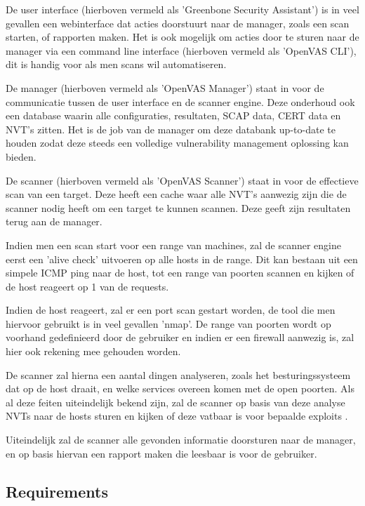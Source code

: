 De user interface (hierboven vermeld als 'Greenbone Security Assistant') is in veel gevallen een webinterface dat acties doorstuurt naar de manager, zoals een scan starten, of rapporten maken. Het is ook mogelijk om acties door te sturen naar de manager via een command line interface (hierboven vermeld als 'OpenVAS CLI'), dit is handig voor als men scans wil automatiseren.

De manager (hierboven vermeld als 'OpenVAS Manager') staat in voor de communicatie tussen de user interface en de scanner engine. Deze onderhoud ook een database waarin alle configuraties, resultaten, SCAP data, CERT data en NVT's zitten. Het is de job van de manager om deze databank up-to-date te houden zodat deze steeds een volledige vulnerability management oplossing kan bieden.

De scanner (hierboven vermeld als 'OpenVAS Scanner') staat in voor de effectieve scan van een target. Deze heeft een cache waar alle NVT's aanwezig zijn die de scanner nodig heeft om een target te kunnen scannen. Deze geeft zijn resultaten terug aan de manager. 

Indien men een scan start voor een range van machines, zal de scanner engine eerst een 'alive check' uitvoeren op alle hosts in de range. Dit kan bestaan uit een simpele ICMP ping naar de host, tot een range van poorten scannen en kijken of de host reageert op 1 van de requests. 

Indien de host reageert, zal er een port scan gestart worden, de tool die men hiervoor gebruikt is in veel gevallen 'nmap'. De range van poorten wordt op voorhand gedefinieerd door de gebruiker en indien er een firewall aanwezig is, zal hier ook rekening mee gehouden worden. 

De scanner zal hierna een aantal dingen analyseren, zoals het besturingssysteem dat op de host draait, en welke services overeen komen met de open poorten. Als al deze feiten uiteindelijk bekend zijn, zal de scanner op basis van deze analyse NVTs naar de hosts sturen en kijken of deze vatbaar is voor bepaalde exploits \textcite{Qualys}.

Uiteindelijk zal de scanner alle gevonden informatie doorsturen naar de manager, en op basis hiervan een rapport maken die leesbaar is voor de gebruiker.

\subsection{Requirements}


